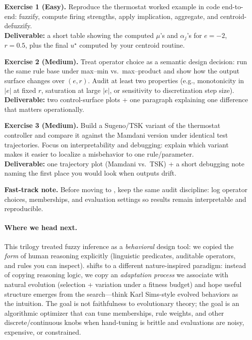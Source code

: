\begin{tcolorbox}[summarybox, title={Exercises}]
\textbf{Exercise 1 (Easy).} Reproduce the thermostat worked example in code end-to-end: fuzzify, compute firing strengths, apply implication, aggregate, and centroid-defuzzify. \\
\textbf{Deliverable:} a short table showing the computed \(\mu\)'s and \(\alpha_j\)'s for \(e=-2\), \(r=0.5\), plus the final \(u^\star\) computed by your centroid routine.

\smallskip
\textbf{Exercise 2 (Medium).} Treat operator choice as a semantic design decision: run the same rule base under max--min vs.\ max--product and show how the output surface changes over \((e,r)\). Audit at least two properties (e.g., monotonicity in \(|e|\) at fixed \(r\), saturation at large \(|e|\), or sensitivity to discretization step size). \\
\textbf{Deliverable:} two control-surface plots + one paragraph explaining one difference that matters operationally.

\smallskip
\textbf{Exercise 3 (Medium).} Build a Sugeno/TSK variant of the thermostat controller and compare it against the Mamdani version under identical test trajectories. Focus on interpretability and debugging: explain which variant makes it easier to localize a misbehavior to one rule/parameter. \\
\textbf{Deliverable:} one trajectory plot (Mamdani vs.\ TSK) + a short debugging note naming the first place you would look when outputs drift.

\medskip
\noindent\textbf{Fast-track note.} Before moving to , keep the same audit discipline: log operator choices, memberships, and evaluation settings so results remain interpretable and reproducible.
\end{tcolorbox}

\paragraph{Where we head next.} This trilogy treated fuzzy inference as a \emph{behavioral} design tool: we copied the \emph{form} of human reasoning explicitly (linguistic predicates, auditable operators, and rules you can inspect).  shifts to a different nature-inspired paradigm: instead of copying reasoning logic, we copy an \emph{adaptation process} we associate with natural evolution (selection + variation under a fitness budget) and hope useful structure emerges from the search---think Karl Sims\hyp{}style evolved behaviors as the intuition. The goal is not faithfulness to evolutionary theory; the goal is an algorithmic optimizer that can tune memberships, rule weights, and other discrete/continuous knobs when hand-tuning is brittle and evaluations are noisy, expensive, or constrained.
